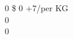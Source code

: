 \footnotesize 0%
\enspace \$
0%
+7/per KG 
\vspace*{0.01em}\\
\small 0%
\vspace*{0.01em}\\
\small 0%
\vspace*{-0.05em}\\
\footnotesize %